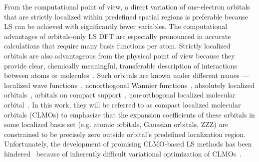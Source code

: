 \documentclass[aps,prl,twocolumn,reprint,amsmath,amssymb]{revtex4-1}
\begin{document}
From the computational point of view, a direct variation of one-electron orbitals that are strictly localized within predefined spatial regions is preferable because LS can be achieved with significantly fewer variables. %
The computational advantages of orbitals-only LS DFT are especially pronounced in accurate calculations that require many basis functions per atom. 
Strictly localized orbitals are also advantageous from the physical point of view because they provide clear, chemically meaningful, transferable description of interactions between atoms or molecules~\cite{ZZZweitao,stoll,khaliullin2007unravelling,khaliullin2008analysis}. 
%
Such orbitals are known under different names --- localized wave functions~\cite{ordejon1995linear}, nonorthogonal Wannier functions~\cite{weitao,ZZZ}, absolutely localized orbitals~\cite{stoll1980use}, orbitals on compact support~\cite{ZZZ}, non-orthogonal localized molecular orbital~\cite{weitao}. In this work, they will be referred to as compact localized molecular orbitals (CLMOs) to emphasize that the expansion coefficients of these orbitals in some localized basis set (e.g. atomic orbitals, Gaussian orbitals, ZZZ) are constrained to be precisely zero outside orbital's predefined localization region.
%
Unfortunately, the development of promising CLMO-based LS methods has been hindered~\cite{a:weitao-yang-2013,a:ls-tsuchida-aomm, fattebert-recent} because of inherently difficult variational optimization of CLMOs~\cite{a:ls-mauri-galli-car-1993,ordejon1995linear,a:ls-rev-1999, fattebert2004linear, peng2013effective, a:ls-tsuchida-aomm, weitao-yang}. 
%
\end{document}
